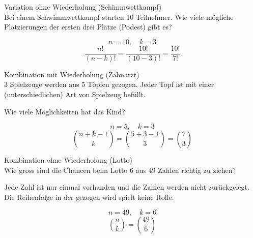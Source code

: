 \begin{example}{Variation ohne Wiederholung (Schimmwettkampf)}\\
Bei einem Schwimmwettkampf starten 10 Teilnehmer. Wie viele mögliche Platzierungen der ersten drei Plätze (Podest) gibt es?

$$n = 10, \quad k = 3$$
$$\frac{n!}{(n-k)!} = \frac{10!}{(10-3)!} = \frac{10!}{7!}$$
\end{example}

\begin{example}{Kombination mit Wiederholung (Zahnarzt)}\\
3 Spielzeuge werden aus 5 Töpfen gezogen. Jeder Topf ist mit einer (unterschiedlichen) Art von Spielzeug befüllt.

Wie viele Möglichkeiten hat das Kind?

$$n = 5, \quad k = 3$$
$$\binom{n+k-1}{k} = \binom{5+3-1}{3} = \binom{7}{3}$$
\end{example}

\begin{example}{Kombination ohne Wiederholung (Lotto)}\\
Wie gross sind die Chancen beim Lotto 6 aus 49 Zahlen richtig zu ziehen?

Jede Zahl ist nur einmal vorhanden und die Zahlen werden nicht zurückgelegt. Die Reihenfolge in der gezogen wird spielt keine Rolle.

$$n = 49, \quad k = 6$$
$$\binom{n}{k} = \binom{49}{6}$$
\end{example}
